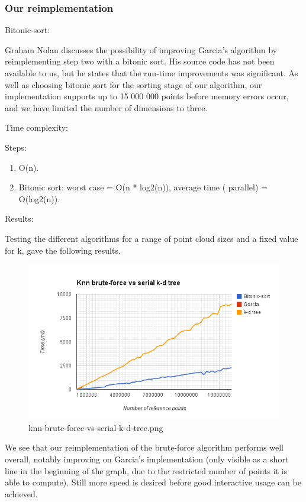 \subsubsection{Our reimplementation} %
\label{ssub:our_reimplementation_2}

Bitonic-sort:

Graham Nolan discusses the possibility of improving Garcia's algorithm by reimplementing step two with a bitonic sort. His source code has not been available to us, but he states that the run-time improvements was significant. As well as choosing bitonic sort for the sorting stage of our algorithm, our implementation supports up to 15 000 000 points before memory errors occur, and we have limited the number of dimensions to three.

Time complexity:

Steps:
\begin{enumerate}
    \item O(n).
    \item Bitonic sort: worst case = O(n * log2(n)), average time ( parallel) = O(log2(n)).
\end{enumerate}

Results:

Testing the different algorithms for a range of point cloud sizes and a fixed value for k, gave the following results.

\begin{figure}[ht!]
\centering
\includegraphics[width=120mm]{../gfx/knn-brute-force-vs-serial-k-d-tree.png}

\caption{knn-brute-force-vs-serial-k-d-tree.png}
\label{fig:knn_brute_force_vs_serial_k_d_tree}
\end{figure}

We see that our reimplementation of the brute-force algorithm performs well overall, notably improving on Garcia's implementation (only visible as a short line in the beginning of the graph, due to the restricted number of points it is able to compute). Still more speed is desired before good interactive usage can be achieved.

